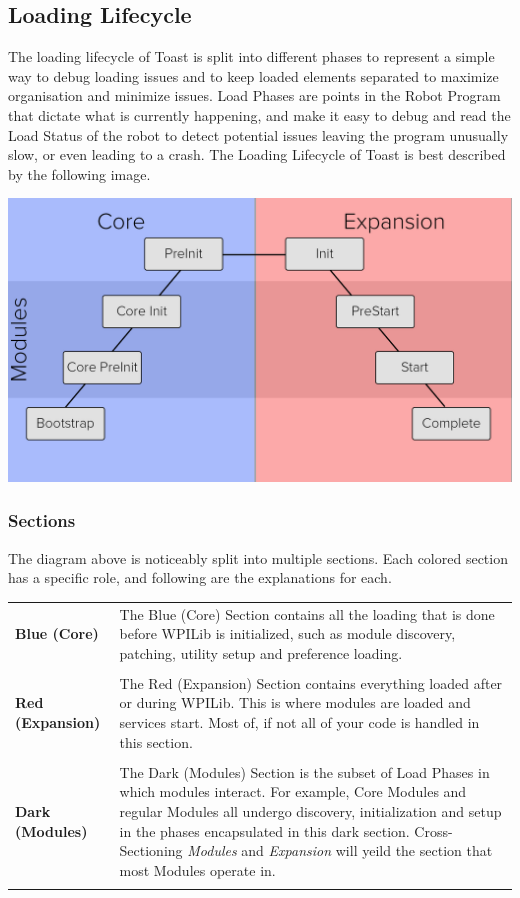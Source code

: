 \documentclass[a4paper,12pt]{article}
\begin{document}
\subsection{Loading Lifecycle}
The loading lifecycle of Toast is split into different phases to represent a simple way to debug loading issues and to keep loaded elements separated to maximize organisation and minimize issues. Load Phases are points in the Robot Program that dictate what is currently happening, and make it easy to debug and read the Load Status of the robot to detect potential issues leaving the program unusually slow, or even leading to a crash. The Loading Lifecycle of Toast is best described by the following image.

\includegraphics[width=17cm]{img/lifecycle.png}

\subsubsection{Sections}
The diagram above is noticeably split into multiple sections. Each colored section has a specific role, and following are the explanations for each.

\begin{tabular}{p{3.5cm}p{12.5cm}}
	\textbf{Blue (Core)} &
		The Blue (Core) Section contains all the loading that is done before WPILib is initialized, such as module discovery, patching, utility setup and preference loading.\\\\
	\textbf{Red (Expansion)} &
		The Red (Expansion) Section contains everything loaded after or during WPILib. This is where modules are loaded and services start. Most of, if not all of your code is handled in this section.\\\\
	\textbf{Dark (Modules)} &
		The Dark (Modules) Section is the subset of Load Phases in which modules interact. For example, Core Modules and regular Modules all undergo discovery, initialization and setup in the phases encapsulated in this dark section. Cross-Sectioning \textit{Modules} and \textit{Expansion} will yeild the section that most Modules operate in.\\\\
\end{tabular}
\end{document}
